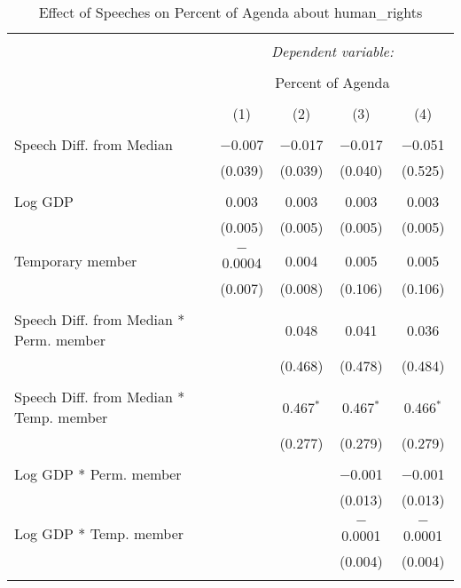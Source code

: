 
\begin{table}[!htbp] \centering 
  \caption{Effect of Speeches on Percent of Agenda about  human_rights} 
  \label{} 
\begin{tabular}{@{\extracolsep{5pt}}lcccc} 
\\[-1.8ex]\hline 
\hline \\[-1.8ex] 
 & \multicolumn{4}{c}{\textit{Dependent variable:}} \\ 
\cline{2-5} 
\\[-1.8ex] & \multicolumn{4}{c}{Percent of Agenda} \\ 
\\[-1.8ex] & (1) & (2) & (3) & (4)\\ 
\hline \\[-1.8ex] 
 Speech Diff. from Median & $-$0.007 & $-$0.017 & $-$0.017 & $-$0.051 \\ 
  & (0.039) & (0.039) & (0.040) & (0.525) \\ 
  & & & & \\ 
 Log GDP & 0.003 & 0.003 & 0.003 & 0.003 \\ 
  & (0.005) & (0.005) & (0.005) & (0.005) \\ 
  & & & & \\ 
 Temporary member & $-$0.0004 & 0.004 & 0.005 & 0.005 \\ 
  & (0.007) & (0.008) & (0.106) & (0.106) \\ 
  & & & & \\ 
 Speech Diff. from Median * Perm. member &  & 0.048 & 0.041 & 0.036 \\ 
  &  & (0.468) & (0.478) & (0.484) \\ 
  & & & & \\ 
 Speech Diff. from Median * Temp. member &  & 0.467$^{*}$ & 0.467$^{*}$ & 0.466$^{*}$ \\ 
  &  & (0.277) & (0.279) & (0.279) \\ 
  & & & & \\ 
 Log GDP * Perm. member &  &  & $-$0.001 & $-$0.001 \\ 
  &  &  & (0.013) & (0.013) \\ 
  & & & & \\ 
 Log GDP * Temp. member &  &  & $-$0.0001 & $-$0.0001 \\ 
  &  &  & (0.004) & (0.004) \\ 
  & & & & \\ 

\end{tabular}
\end{table}
